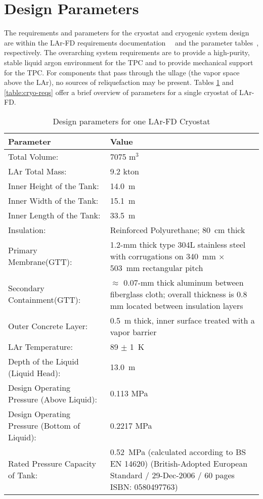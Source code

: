 \section{Design Parameters}
\label{sec:cryo-cryosys-params}

The requirements and parameters for the cryostat and cryogenic system design are within the LAr-FD requirements documentation~\cite{lar-fd-req}~\cite{lar-fd-req-traceback}  and the parameter tables~\cite{lar-fd-params}, respectively. The overarching system requirements are to provide a high-purity, stable liquid argon environment for the TPC and to provide mechanical support for the TPC. 
For components that pass through the ullage (the vapor space above the LAr), no sources of reliquefaction may be present. Tables \ref{table:param-summ-LAr-FD} and 
\ref{table:cryo-reqs} offer a brief overview of parameters for a single cryostat of LAr-FD.

\begin{table}
\caption{Design parameters for one LAr-FD Cryostat}
\label{table:param-summ-LAr-FD}
 \begin{tabular}[htbp]{|l| p{8cm} |}
\hline 
\textbf{Parameter} &  \textbf{Value} \\
\hline
Total Volume: &  7075 m$^3$ \\
\hline
LAr Total Mass: & 9.2 kton \\
\hline
Inner Height of the Tank: & 14.0~m \\
\hline
Inner Width of the Tank: & 15.1~m \\
\hline
Inner Length of the Tank: & 33.5~m  \\
\hline
Insulation:&  Reinforced Polyurethane; 80~cm thick \\
\hline
Primary Membrane(GTT): & 1.2-mm thick type 304L stainless steel with corrugations on 340~mm $\times$ 503~mm rectangular pitch\\
\hline
Secondary Containment(GTT): &  $\approx$ 0.07-mm thick aluminum between fiberglass cloth; overall thickness is 0.8 mm located between insulation layers \\
\hline
Outer Concrete Layer: & 0.5~m thick, inner surface treated with a vapor barrier \\
\hline
LAr Temperature: & 89 $\pm$ 1~K \\
\hline
Depth of the Liquid (Liquid Head): & 13.0~m \\
\hline
Design Operating Pressure (Above Liquid):&  0.113 MPa \\
\hline
Design Operating Pressure (Bottom of Liquid):&  0.2217 MPa \\
\hline
Rated Pressure Capacity of Tank:& 0.52~MPa (calculated according to BS EN 14620)
(British-Adopted European Standard / 29-Dec-2006 / 60 pages ISBN: 0580497763) \\
\hline
\end{tabular} 
\end{table}

